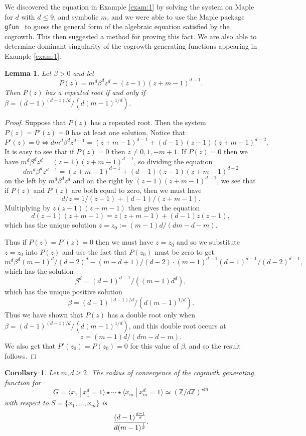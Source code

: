 \documentclass[11pt]{amsart}
\newtheorem{lemma}[theorem]{Lemma}
\newtheorem{corollary}[theorem]{Corollary}
\theoremstyle{definition}
\newcommand{\Z}{\mathbb{Z}}
\begin{document}
We discovered the equation in Example \ref{exam:1} by solving the system on Maple for $d$ with $d\le 9$, and symbolic $m$, and we were able to use the Maple package {\tt gfun}~\cite{gfun} to guess the general form of the algebraic equation satisfied by the cogrowth.  This then suggested a method for proving this fact. We are also able to determine dominant singularity of the cogrowth generating functions appearing in Example \ref{exam:1}. 
\begin{lemma}
Let $\beta>0$ and let 
\[P(z)=m^d \beta^d z^d - (z-1)(z+m-1)^{d-1}.\] Then $P(z)$ has a repeated root if and only if $\beta= (d-1)^{(d-1)/d}/(d(m-1)^{1/d})$.
\end{lemma}
\begin{proof}
Suppose that $P(z)$ has a repeated root.  Then the system $P(z)=P'(z)=0$ has at least one solution.  Notice that
$$P'(z)=0 \iff  d m^d \beta^d z^{d-1} = (z+m-1)^{d-1} + (d-1)(z-1) (z+m-1)^{d-2}.$$
It is easy to see that if $P(z)=0$ then $z\neq 0,1,-m+1$.  If $P(z)=0$ then we have
$m^d \beta^d z^d=(z-1)(z+m-1)^{d-1}$, so
dividing the equation
$$d m^d \beta^d z^{d-1} = (z+m-1)^{d-1} + (d-1)(z-1) (z+m-1)^{d-2}$$ on the left by
$m^d\beta^d z^d$ and on the right by $(z-1)(z+m-1)^{d-1}$, we see that if $P(z)$ and $P'(z)$ are both equal to zero, then we must have
$$d/z = 1/(z-1) + (d-1)/(z+m-1).$$  Multiplying by $z(z-1)(z+m-1)$ then gives the equation
$$d(z-1)(z+m-1) = z(z+m-1) + (d-1) z(z-1),$$ which has the unique solution
$z=z_0:=(m-1)d/(dm-d-m)$.

Thus if $P(z)=P'(z)=0$ then we must have $z=z_0$ and so we substitute $z=z_0$ into $P(z)$ and use the fact that $P(z_0)$ must be zero to get
$$m^d \beta^d (m-1)^d/(d-2)^d - (m-d+1)/(d-2) \cdot (m-1)^{d-1}(d-1)^{d-1}/(d-2)^{d-1},$$
which has the solution
$$\beta^d =(d-1)^{d-1}/((m-1)d^d),$$ which has the unique positive solution
$$\beta= (d-1)^{(d-1)/d}/(d(m-1)^{1/d}).$$ Thus we have shown that $P(z)$ has a double root only when $\beta= (d-1)^{(d-1)/d}/(d(m-1)^{1/d})$, and this double root occurs at 
$$z=(m-1)d/(dm-d-m).$$ We also get that $P'(z_0)=P(z_0)=0$ for this value of $\beta$, and so the result follows.
\end{proof}
\begin{corollary}\label{cor:main3} Let $m,d\ge 2$.  The radius of convergence of the cogrowth generating function for  
$$G=\langle x_1~|~x_1^d=1\rangle \star \cdots \star \langle x_m~|~x_m^d=1\rangle\simeq (\Z/d\Z)^{\star m}$$ 
with respect to $S=\{x_1,\ldots ,x_m\}$ is 
$$\displaystyle{{(d-1)^{\frac{d-1}{d}}\over d(m-1)^{\frac{1}{d}}}}.$$

\end{corollary}
\end{document}
